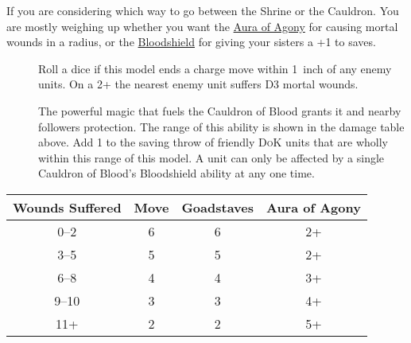 \newpage %
If you are considering which way to go between the Shrine or the
Cauldron. You are mostly weighing up whether you want the
\hyperref[aura-of-agony]{Aura of Agony} for causing mortal wounds in a radius,
or the \hyperref[bloodshield]{Bloodshield} for giving your sisters a +1 to
saves.\\

\begin{description}
    \item [] Roll a dice if this model
        ends a charge move within 1~inch of any enemy units. On a 2+ the
        nearest enemy unit suffers D3 mortal wounds.
    \item [] The powerful magic that fuels
        the Cauldron of Blood grants it and nearby followers protection. The
        range of this ability is shown in the damage table above. Add 1 to the
        saving throw of friendly \textsc{DoK} units that are wholly
        within this range of this model. A unit can only be affected by
        a single Cauldron of Blood’s Bloodshield ability at any one time.
\end{description}




\begin{scriptsize}
\noindent
    \begin{tabular}{cccc} %
    \toprule
    Wounds Suffered & Move & Goadstaves & Aura of Agony \\
    \midrule
    0--2 & 6 &  6  & 2+ \\
    3--5 & 5 &  5  & 2+ \\
    6--8 & 4 &  4  & 3+ \\
    9--10& 3 &  3  & 4+ \\
    11+  & 2 &  2  & 5+ \\
    \bottomrule
\end{tabular}
\end{scriptsize}
\vspace{1em}

